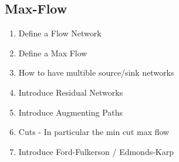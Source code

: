 \subsection{Max-Flow}
\begin{enumerate}
  \item Define a Flow Network
  \item Define a Max Flow
  \item How to have multible source/sink networks
  \item Introduce Residual Networks
  \item Introduce Augmenting Paths
  \item Cuts - In particular the min cut max flow
  \item Introduce Ford-Fulkerson / Edmonds-Karp
\end{enumerate}